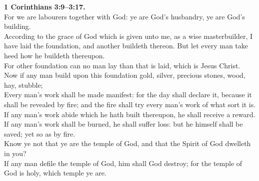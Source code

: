 \documentclass[10pt]{article} %
\begin{document}
{\begin{minipage}[t]{0.45\textwidth}
\textbf{1 Corinthians 3:9--3:17.}\\
For we are labourers together with God: ye are God's husbandry, ye are God's building.\\
According to the grace of God which is given unto me, as a wise masterbuilder, I have laid the foundation, and another buildeth thereon. But let every man take heed how he buildeth thereupon.\\
For other foundation can no man lay than that is laid, which is Jesus Christ.\\
Now if any man build upon this foundation gold, silver, precious stones, wood, hay, stubble;\\
Every man's work shall be made manifest: for the day shall declare it, because it shall be revealed by fire; and the fire shall try every man's work of what sort it is.\\
If any man's work abide which he hath built thereupon, he shall receive a reward.\\
If any man's work shall be burned, he shall suffer loss: but he himself shall be saved; yet so as by fire.\\
Know ye not that ye are the temple of God, and that the Spirit of God dwelleth in you?\\
If any man defile the temple of God, him shall God destroy; for the temple of God is holy, which temple ye are.\\

\end{minipage}}
\vspace*{\fill}
\newpage
\Huge%
\vspace*{\fill}
\begin{spacing}{1.3}%
\end{spacing}
\vspace*{\fill}
\end{document}

